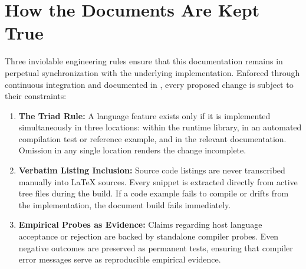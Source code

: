 \documentclass[journal,onecolumn,9pt]{IEEEtran}
\begin{document}
\section{How the Documents Are Kept True}

Three inviolable engineering rules ensure that this documentation remains in
perpetual synchronization with the underlying implementation. Enforced through
continuous integration and documented in , every proposed change
is subject to their constraints:

\begin{enumerate}
\item \textbf{The Triad Rule:} A language feature exists only if it is
  implemented simultaneously in three locations: within the runtime library,
  in an automated compilation test or reference example, and in the relevant
  documentation. Omission in any single location renders the change incomplete.
\item \textbf{Verbatim Listing Inclusion:} Source code listings are never
  transcribed manually into \LaTeX{} sources. Every snippet is extracted
  directly from active tree files during the build. If a code example fails to
  compile or drifts from the implementation, the document build fails
  immediately.
\item \textbf{Empirical Probes as Evidence:} Claims regarding host language
  acceptance or rejection are backed by standalone compiler probes. Even
  negative outcomes are preserved as permanent tests, ensuring that compiler
  error messages serve as reproducible empirical evidence.
\end{enumerate}
\end{document}
